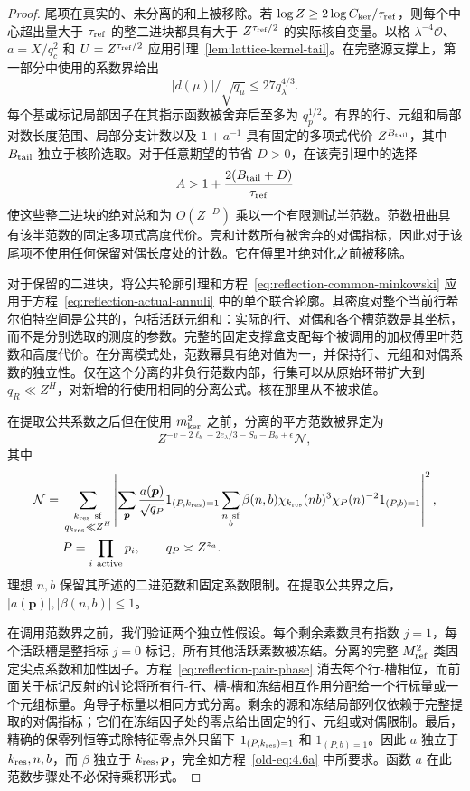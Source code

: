 \documentclass[11pt,a4paper]{article}
\numberwithin{equation}{section}
\numberwithin{figure}{section}
\theoremstyle{definition}
\theoremstyle{remark}
\begin{document}
\begin{proof}
尾项在真实的、未分离的和上被移除。若
\(\log Z\ge2\log C_{\rm ker}/\tau_{\rm ref}\)，则每个中心超出量大于 \(\tau_{\rm ref}\) 的整二进块都具有大于 \(Z^{\tau_{\rm ref}/2}\) 的实际核自变量。以格 \(\lambda^{-4}\mathcal O\)、\(a=X/q_c^2\) 和 \(U=Z^{\tau_{\rm ref}/2}\) 应用引理~\ref{lem:lattice-kernel-tail}。在完整源支撑上，第一部分中使用的系数界给出
\[
 |d(\mu)|/\sqrt{q_\mu}\le27q_\lambda^{4/3}.
\]
每个基或标记局部因子在其指示函数被舍弃后至多为 \(q_p^{1/2}\)。有界的行、元组和局部对数长度范围、局部分支计数以及 \(1+a^{-1}\) 具有固定的多项式代价 \(Z^{B_{\rm tail}}\)，其中 \(B_{\rm tail}\) 独立于核阶选取。对于任意期望的节省 \(D>0\)，在该壳引理中的选择
\[
 A>1+\frac{2(B_{\rm tail}+D)}{\tau_{\rm ref}}
\]
使这些整二进块的绝对总和为 \(O(Z^{-D})\) 乘以一个有限测试半范数。范数扭曲具有该半范数的固定多项式高度代价。壳和计数所有被舍弃的对偶指标，因此对于该尾项不使用任何保留对偶长度处的计数。它在傅里叶绝对化之前被移除。

对于保留的二进块，将公共轮廓引理和方程~\eqref{eq:reflection-common-minkowski} 应用于方程~\eqref{eq:reflection-actual-annuli} 中的单个联合轮廓。其密度对整个当前行希尔伯特空间是公共的，包括活跃元组和：实际的行、对偶和各个槽范数是其坐标，而不是分别选取的测度的参数。完整的固定支撑盒支配每个被调用的加权傅里叶范数和高度代价。在分离模式处，范数幂具有绝对值为一，并保持行、元组和对偶系数的独立性。仅在这个分离的非负行范数内部，行集可以从原始环带扩大到 \(q_R\ll Z^H\)，对新增的行使用相同的分离公式。核在那里从不被求值。

在提取公共系数之后但在使用 \(m_{\rm ker}^2\) 之前，分离的平方范数被界定为
\[
 Z^{-v-2\ell_b-2e_\lambda/3-S_0-B_0+\epsilon}\mathcal N,
\]
其中
\begin{equation}\label{old-eq:4.6a}
 \begin{split}
 \mathcal N={}&
 \sum_{\substack{k_{\rm res}\ {\rm sf}\\q_{k_{\rm res}}\ll Z^H}}
 \left|
 \sum_{\boldsymbol p}
 \frac{a(\boldsymbol p)}{\sqrt{q_P}}1_{(P,k_{\rm res})=1}
 \sum_{\substack{n\ {\rm sf}\\b}}
 \beta(n,b)\chi_{k_{\rm res}}(nb)^3
              \chi_P(n)^{-2}1_{(P,b)=1}
 \right|^2,\\
 &P=\prod_{i\ {\rm active}}p_i,\qquad q_P\asymp Z^{z_a}.
 \end{split}
\end{equation}
理想 \(n,b\) 保留其所述的二进范数和固定系数限制。在提取公共界之后，
\(|a(\boldsymbol p)|,|\beta(n,b)|\le1\)。

在调用范数界之前，我们验证两个独立性假设。每个剩余素数具有指数 \(j=1\)，每个活跃槽是整指标 \(j=0\) 标记，所有其他活跃素数被冻结。分离的完整 \(M_{\rm ref}^2\) 类固定尖点系数和加性因子。方程~\eqref{eq:reflection-pair-phase} 消去每个行-槽相位，而前面关于标记反射的讨论将所有行-行、槽-槽和冻结相互作用分配给一个行标量或一个元组标量。角导子标量以相同方式分离。剩余的源和冻结局部列仅依赖于完整提取的对偶指标；它们在冻结因子处的零点给出固定的行、元组或对偶限制。最后，精确的保零列恒等式除特征零点外只留下
\(1_{(P,k_{\rm res})=1}\) 和 \(1_{(P,b)=1}\)。因此 \(a\) 独立于 \(k_{\rm res},n,b\)，而 \(\beta\)
独立于 \(k_{\rm res},\boldsymbol p\)，完全如方程~\eqref{old-eq:4.6a} 中所要求。函数 \(a\) 在此范数步骤处不必保持乘积形式。


\end{proof}
\end{document}

